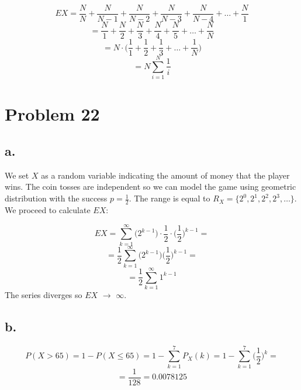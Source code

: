 \documentclass{article}
\begin{document}
\begin{equation*}
    EX = \frac{N}{N} + \frac{N}{N-1} + \frac{N}{N-2} + \frac{N}{N-3} + \frac{N}{N-4} + \dots + \frac{N}{1}
\end{equation*}
\begin{equation*}
    =  \frac{N}{1} + \frac{N}{2} + \frac{N}{3} + \frac{N}{4} + \frac{N}{5} + \dots + \frac{N}{N}
\end{equation*}
\begin{equation*}
    = N \cdot \Big( \frac{1}{1} + \frac{1}{2} + \frac{1}{3} + \dots + \frac{1}{N} \Big)
\end{equation*}
\begin{equation*}
    = N \sum_{i=1}^{N} \frac{1}{i}
\end{equation*}

\section*{Problem 22}

\subsection*{a.}

We set \(X\) as a random variable indicating the amount of money that the player wins.
The coin tosses are independent so we can model the game using geometric distribution with
the success \(p = \frac{1}{2}\). The range is equal to \(R_{X} = \{2^{0}, 2^{1}, 2^{2}, 2^{3}, \dots \}\).
We proceed to calculate \(EX\):

\begin{equation*}
    EX = \sum_{k=1}^{\infty} \Big(2^{k-1}\Big) \cdot \frac{1}{2} \cdot \Big(\frac{1}{2}\Big)^{k-1} =
\end{equation*}
\begin{equation*}
    = \frac{1}{2} \sum_{k=1}^{\infty} \Big(2^{k-1}\Big) \Big(\frac{1}{2}\Big)^{k-1} =
\end{equation*}
\begin{equation*}
    = \frac{1}{2} \sum_{k=1}^{\infty} 1^{k-1}
\end{equation*}
The series diverges so \(EX\) \(\rightarrow\) \(\infty\).


\subsection*{b.}


\begin{equation*}
    P(X > 65) = 1 - P(X \leq 65) = 1 - \sum_{k=1}^{7} P_{X}(k) = 1 - \sum_{k=1}^{7} \Big(\frac{1}{2}\Big)^{k} =
\end{equation*}
\begin{equation*}
    = \frac{1}{128} = 0.0078125
\end{equation*}
\end{document}
